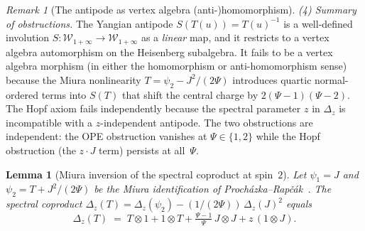 \documentclass[11pt,reqno]{amsart}
\newtheorem{lemma}[theorem]{Lemma}
\theoremstyle{definition}
\theoremstyle{remark}
\newtheorem{remark}[theorem]{Remark}
\newcommand{\cW}{\mathcal{W}}
\numberwithin{equation}{section}
\begin{document}
\begin{remark}[The antipode as vertex algebra
(anti-)homomorphism]
\smallskip
\noindent\emph{(4) Summary of obstructions.}
The Yangian antipode $S(T(u)) = T(u)^{-1}$ is a
well-defined involution $S \colon \cW_{1+\infty} \to
\cW_{1+\infty}$ as a \emph{linear} map, and it restricts
to a vertex algebra automorphism on the Heisenberg
subalgebra. It fails to be a vertex algebra morphism (in
either the homomorphism or anti-homomorphism sense) because
the Miura nonlinearity $T = \psi_2 - J^2/(2\Psi)$
introduces quartic normal-ordered terms into $S(T)$ that
shift the central charge by $2(\Psi-1)(\Psi-2)$. The
Hopf axiom fails independently because the spectral
parameter $z$ in $\Delta_z$ is incompatible with a
$z$-independent antipode.
The two obstructions are independent: the OPE obstruction
vanishes at $\Psi \in \{1,2\}$ while the Hopf obstruction
(the $z \cdot J$ term) persists at all~$\Psi$.
\end{remark}

\begin{lemma}[Miura inversion of the spectral coproduct at
spin~$2$]
\label{lem:coprod-T-miura}
Let $\psi_1 = J$ and $\psi_2 = T + J^2/(2\Psi)$ be the
Miura identification of
Proch\'azka--Rap\v{c}\'ak~\textup{\cite{PR19}}.
The spectral coproduct
$\Delta_z(T)
= \Delta_z(\psi_2) - (1/(2\Psi))\,\Delta_z(J)^2$
equals
\begin{equation}\label{eq:coprod-T-derived}
  \Delta_z(T)
  \;=\;
  T \otimes 1
  + 1 \otimes T
  + \tfrac{\Psi - 1}{\Psi}\,
  J \otimes J
  + z\,(1 \otimes J).
\end{equation}
\end{lemma}
\end{document}
